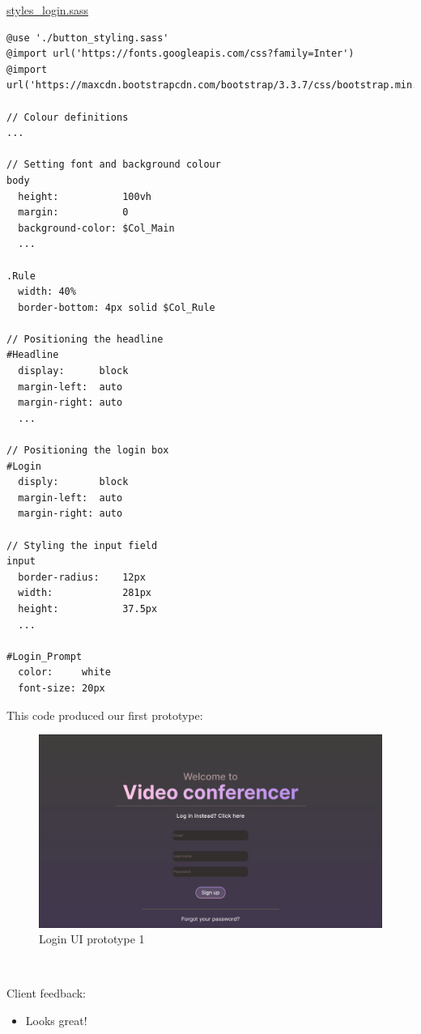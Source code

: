 \underline{styles\_login.sass}

\begin{verbatim}
@use './button_styling.sass'
@import url('https://fonts.googleapis.com/css?family=Inter')
@import url('https://maxcdn.bootstrapcdn.com/bootstrap/3.3.7/css/bootstrap.min.css')

// Colour definitions
...

// Setting font and background colour
body
  height:           100vh
  margin:           0
  background-color: $Col_Main
  ...

.Rule
  width: 40%
  border-bottom: 4px solid $Col_Rule

// Positioning the headline
#Headline
  display:      block
  margin-left:  auto
  margin-right: auto
  ...

// Positioning the login box
#Login
  disply:       block
  margin-left:  auto
  margin-right: auto

// Styling the input field
input
  border-radius:    12px
  width:            281px
  height:           37.5px
  ...

#Login_Prompt
  color:     white
  font-size: 20px
\end{verbatim}

This code produced our first prototype:

\begin{figure}[H]
  \centering
  \includegraphics[scale=0.2]{Images/LoginUI.png}
  \caption{Login UI prototype 1}
\end{figure}

{\color{gray} \hrulefill} \\ \vspace{0.2cm}

{\sffamily Client feedback:}

\begin{itemize}
  \item Looks great!
\end{itemize}

